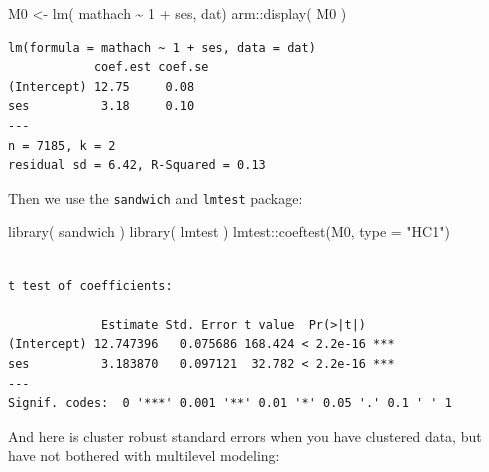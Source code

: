 \documentclass[
  letterpaper,
  DIV=11,
  numbers=noendperiod]{scrreprt}
\newenvironment{Shaded}{}{}
\newcommand{\AttributeTok}[1]{\textcolor[rgb]{0.49,0.56,0.16}{#1}}
\newcommand{\DecValTok}[1]{\textcolor[rgb]{0.25,0.63,0.44}{#1}}
\newcommand{\FunctionTok}[1]{\textcolor[rgb]{0.02,0.16,0.49}{#1}}
\newcommand{\NormalTok}[1]{#1}
\newcommand{\OtherTok}[1]{\textcolor[rgb]{0.00,0.44,0.13}{#1}}
\newcommand{\SpecialCharTok}[1]{\textcolor[rgb]{0.25,0.44,0.63}{#1}}
\newcommand{\StringTok}[1]{\textcolor[rgb]{0.25,0.44,0.63}{#1}}
\begin{document}
\begin{Shaded}
\begin{Highlighting}[]
\NormalTok{M0 }\OtherTok{\textless{}{-}} \FunctionTok{lm}\NormalTok{( mathach }\SpecialCharTok{\textasciitilde{}} \DecValTok{1} \SpecialCharTok{+}\NormalTok{ ses, dat) }
\NormalTok{arm}\SpecialCharTok{::}\FunctionTok{display}\NormalTok{( M0 )}
\end{Highlighting}
\end{Shaded}

\begin{verbatim}
lm(formula = mathach ~ 1 + ses, data = dat)
            coef.est coef.se
(Intercept) 12.75     0.08  
ses          3.18     0.10  
---
n = 7185, k = 2
residual sd = 6.42, R-Squared = 0.13
\end{verbatim}

Then we use the \texttt{sandwich} and \texttt{lmtest} package:

\begin{Shaded}
\begin{Highlighting}[]
\FunctionTok{library}\NormalTok{( sandwich )}
\FunctionTok{library}\NormalTok{( lmtest )}
\NormalTok{lmtest}\SpecialCharTok{::}\FunctionTok{coeftest}\NormalTok{(M0, }\AttributeTok{type =} \StringTok{"HC1"}\NormalTok{)}
\end{Highlighting}
\end{Shaded}

\begin{verbatim}

t test of coefficients:

             Estimate Std. Error t value  Pr(>|t|)    
(Intercept) 12.747396   0.075686 168.424 < 2.2e-16 ***
ses          3.183870   0.097121  32.782 < 2.2e-16 ***
---
Signif. codes:  0 '***' 0.001 '**' 0.01 '*' 0.05 '.' 0.1 ' ' 1
\end{verbatim}

And here is cluster robust standard errors when you have clustered data,
but have not bothered with multilevel modeling:

\begin{Shaded}
\end{Shaded}
\end{document}
